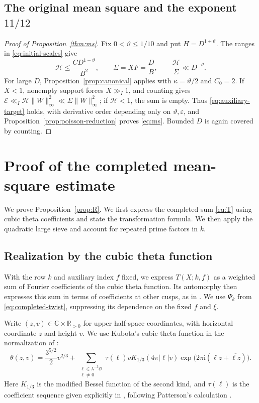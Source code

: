 \documentclass[11pt,a4paper]{article}
\numberwithin{equation}{section}
\numberwithin{figure}{section}
\theoremstyle{definition}
\theoremstyle{remark}
\newcommand{\OO}{\mathcal O}
\newcommand{\E}{\mathcal E}
\begin{document}
\subsection{The original mean square and the exponent $11/12$}
\label{sec:completion}
\begin{proof}[Proof of Proposition~\ref{thm:ms}]
Fix $0<\vartheta\le1/10$ and put $H=D^{1+\vartheta}$.
The ranges in \eqref{eq:initial-scales} give
\begin{equation}\label{eq:initial-positive-gap}
 \mathcal H\le\frac{CD^{1-\vartheta}}{B^2},\qquad
 \Sigma=XF=\frac DB,\qquad
 \frac{\mathcal H}{\Sigma}\ll D^{-\vartheta}.
\end{equation}
For large $D$, Proposition~\ref{prop:canonical} applies with
$\kappa=\vartheta/2$ and $C_0=2$. If $X<1$, nonempty support forces
$X\gg_I1$, and counting gives $\E\ll_I\mathcal H\|W\|_\infty^2
\ll\Sigma\|W\|_\infty^2$; if $\mathcal H<1$, the sum is empty.
Thus \eqref{eq:auxiliary-target} holds, with derivative order depending
only on $\vartheta,\varepsilon$, and
Proposition~\ref{prop:poisson-reduction} proves \eqref{eq:ms}.
Bounded $D$ is again covered by counting.
\end{proof}


\section{Proof of the completed mean-square estimate}\label{sec:reflection}

We prove Proposition~\ref{prop:R}. We first express the completed sum
\eqref{eq:T} using cubic theta coefficients and state the transformation
formula. We then apply the quadratic large sieve and account for
repeated prime factors in $k$.

\subsection{Realization by the cubic theta function}
With the row $k$ and auxiliary index $f$ fixed, we express
$T(X;k,f)$ as a weighted sum of Fourier coefficients of the cubic theta function.
Its automorphy then expresses this sum in terms of coefficients at
other cusps, as in \cite[\S5 and Appendix~A]{DR}.
We use $\Psi_k$ from \eqref{eq:completed-twist}, suppressing its dependence on the fixed $f$ and $\xi$.

Write $(z,v)\in\mathbb C\times\mathbb R_{>0}$ for upper half-space
coordinates, with horizontal coordinate $z$ and height $v$.
We use Kubota's cubic theta function in the normalization of
\cite[\S5.1, (5.6)]{DR}:
\begin{equation}\label{eq:cubic-theta-definition}
 \theta(z,v)=\frac{3^{5/2}}2v^{2/3}
 +\sum_{\substack{\ell\in\lambda^{-3}\OO\\\ell\ne0}}
 \tau(\ell)vK_{1/3}(4\pi|\ell|v)
 \exp\!\bigl(2\pi\mathrm i(\ell z+\overline{\ell z})\bigr).
\end{equation}
Here $K_{1/3}$ is the modified Bessel function of the second kind,
and $\tau(\ell)$ is the coefficient sequence given explicitly in
\cite[(5.7)--(5.8)]{DR}, following Patterson's calculation
\cite[Theorem~8.1]{Pat77}.
\end{document}
